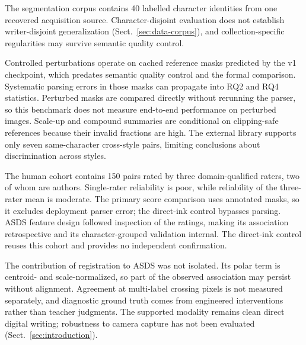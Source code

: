 The segmentation corpus contains 40 labelled character identities from one
recovered acquisition source. Character-disjoint evaluation does not
establish writer-disjoint generalization (Sect.~\ref{sec:data-corpus}), and
collection-specific regularities may survive semantic quality control.

Controlled perturbations operate on cached reference masks predicted by
the v1 checkpoint, which predates semantic quality control and the formal
comparison. Systematic parsing errors in those masks can propagate into
RQ2 and RQ4 statistics. Perturbed masks are compared directly without
rerunning the parser, so this benchmark does not measure end-to-end
performance on perturbed images. Scale-up and compound summaries are
conditional on clipping-safe references because their invalid fractions are
high. The external library supports only seven same-character cross-style
pairs, limiting conclusions about discrimination across styles.

The human cohort contains 150 pairs rated by three domain-qualified raters,
two of whom are authors. Single-rater reliability is poor, while reliability
of the three-rater mean is moderate. The primary score comparison uses
annotated masks, so it excludes deployment parser error; the direct-ink
control bypasses parsing. ASDS feature design followed inspection of the
ratings, making its association retrospective and its character-grouped
validation internal. The direct-ink control reuses this cohort and provides
no independent confirmation.

The contribution of registration to ASDS was not isolated. Its polar term
is centroid- and scale-normalized, so part of the observed association may
persist without alignment. Agreement at multi-label crossing pixels is not
measured separately, and diagnostic ground truth comes from engineered
interventions rather than teacher judgments. The supported modality remains
clean direct digital writing; robustness to camera capture has not been
evaluated (Sect.~\ref{sec:introduction}).
